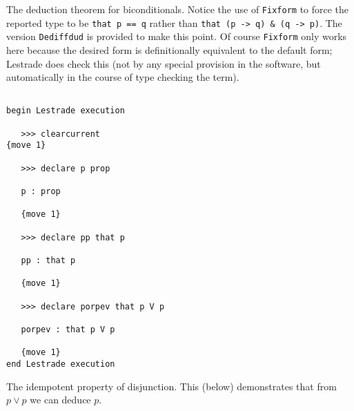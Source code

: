 \documentclass[12pt]{article}
\begin{document}
The deduction theorem for biconditionals.  Notice the use of {\tt Fixform} to force the reported type to be {\tt that p == q} rather than {\tt that (p -> q) \& (q -> p)}.  The version {\tt Dediffdud} is provided to make this point. 
 Of course {\tt Fixform} only works here because the desired form is definitionally equivalent to the default form;  Lestrade does check this (not by any special provision in the software, but automatically in the course of type checking the term).

\begin{verbatim}

begin Lestrade execution

   >>> clearcurrent
{move 1}

   >>> declare p prop

   p : prop

   {move 1}

   >>> declare pp that p

   pp : that p

   {move 1}

   >>> declare porpev that p V p

   porpev : that p V p

   {move 1}
end Lestrade execution
\end{verbatim}

The idempotent property of disjunction.  This (below) demonstrates that from $p \vee p$ we can deduce $p$.
\end{document}
